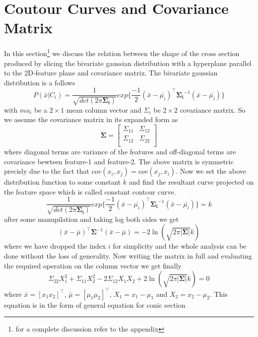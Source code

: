\documentclass[a4paper]{article}
\begin{document}
\section{Coutour Curves and Covariance Matrix}\label{appendix}
In this section\footnote{for a complete discussion refer to the appendix} we discuss the relation between the shape of the cross section produced by slicing the bivariate gaussian distribution with a hyperplane parallel to the 2D-feature plane and covariance matrix. The bivariate gaussian distribution is a follows
\begin{equation}
P(\bar{x}|C_{i}) = \frac{1}{\sqrt{det(2\pi\mathbf{\Sigma_{i}})}}exp\{\frac{-1}{2}(\bar{x}-\bar{\mu_{i}})^{\intercal}\mathbf{\Sigma_{i}}^{-1}(\bar{x}-\bar{\mu_{i}})\}
\end{equation}with $mu_{i}$ be a $2\times1$ mean column vector and $\Sigma_{i}$ be $2\times2$ covariance matrix. So we assume the covariance matrix in its expanded form as
\[
\mathbf{\Sigma} = \left[ {\begin{array}{cc}
\Sigma_{11} & \Sigma_{12} \\
\Sigma_{12} & \Sigma_{22} \\
\end{array}} \right]
\]
where diagonal terms are variance of the features and off-diagonal terms are covariance bewteen feature-1 and feature-2. The above matrix is symmetric precisly due to the fact that $cov(x_{i}, x_{j})=cov(x_{j}, x_{i})$. Now we set the above distribution function to some constant $k$ and find the resultant curve projected on the feature space which is called constant contour curve.
\[
\frac{1}{\sqrt{det(2\pi\mathbf{\Sigma_{i}})}}exp\{\frac{-1}{2}(\bar{x}-\bar{\mu_{i}})^{\intercal}\mathbf{\Sigma_{i}}^{-1}(\bar{x}-\bar{\mu_{i}})\} = k
\]after some manupilation and taking log both sides we get
\[
(\bar{x}-\bar{\mu})^{\intercal}\mathbf{\Sigma}^{-1}(\bar{x}-\bar{\mu})=-2\ln(\sqrt{2\pi\left|\mathbf{\Sigma}\right|}k)
\]where we have dropped the index $i$ for simplicity and the whole analysis can be done without the loss of generality. Now writing the matrix in full and evaluating the required operation on the column vector we get finally
\begin{equation}\label{cov}
\Sigma_{22}X_{1}^{2} + \Sigma_{11}X_{2}^{2} - 2\Sigma_{12}X_{1}X_{2} + 2\ln(\sqrt{2\pi\left|\mathbf{\Sigma}\right|}k)=0
\end{equation}where $\bar{x}=\left[x_{1}x_{2}\right]^{\intercal}$, $\bar{\mu}=\left[\mu_{1} \mu_{2}\right]^{\intercal}$, $X_{1}=x_{1}-\mu_{1}$ and $X_{2}=x_{2}-\mu_{2}$. This equation is in the form of general equation for conic section
\end{document}
